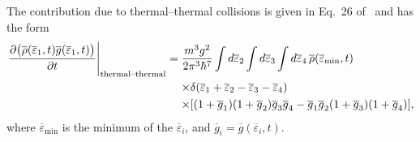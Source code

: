 The contribution due to thermal--thermal collisions is given in Eq.~26 of~\citep{Bijlsma:2000} and has the form
\begin{align}
    \begin{split}
        \left. \frac{\partial\big(\overline{\rho}(\overline{\varepsilon}_1, t) \overline{g}(\overline{\varepsilon}_1, t)\big)}{\partial t}\right|_\text{thermal--thermal} &= \frac{m^3 g^2}{2 \pi^3 \hbar^7} \int d\overline{\varepsilon}_2 \int d\overline{\varepsilon}_3 \int d\overline{\varepsilon}_4 \,\overline{\rho}(\overline{\varepsilon}_\text{min}, t)\\
        &\relphantom{=} \times\delta(\overline{\varepsilon}_1 + \overline{\varepsilon}_2 - \overline{\varepsilon}_3 - \overline{\varepsilon}_4) \\
        &\relphantom{=} \times [ (1+\overline{g}_1) (1+\overline{g}_2) \overline{g}_3 \overline{g}_4 - \overline{g}_1 \overline{g}_2 (1+\overline{g}_3) (1+\overline{g}_4)],
    \end{split}
\end{align}
where $\overline{\varepsilon}_\text{min}$ is the minimum of the $\overline{\varepsilon}_i$, and $\overline{g}_i = \overline{g}(\overline{\varepsilon}_i, t)$. 

